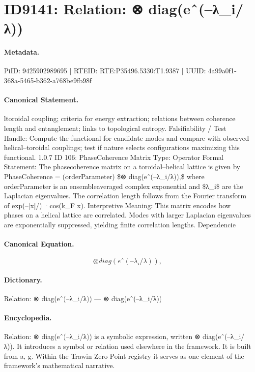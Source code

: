 \section*{ID9141: Relation: ⊗ diag(eˆ(–λ\_i/λ))}
\paragraph{Metadata.}
PiID: 9425902989695 | RTEID: RTE:P35496.5330:T1.9387 | UUID: 4a99a0f1-368a-5465-b362-a768be9fb98f

\paragraph{Canonical Statement.}
ltoroidal coupling; criteria for energy extraction; relations between coherence length and entanglement; links to topological entropy. Falsifiability / Test Handle: Compute the functional for candidate modes and compare with observed helical–toroidal couplings; test if nature selects configurations maximizing this functional. 1.0.7 ID 106: PhaseCoherence Matrix Type: Operator Formal Statement: The phasecoherence matrix on a toroidal–helical lattice is given by PhaseCoherence = (orderParameter) \$⊗ diag(eˆ(–λ\_i/λ)),\$ where orderParameter is an ensembleaveraged complex exponential and \$λ\_i\$ are the Laplacian eigenvalues. The correlation length follows from the Fourier transform of exp(–|x|/) ·cos(k\_F x). Interpretive Meaning: This matrix encodes how phases on a helical lattice are correlated. Modes with larger Laplacian eigenvalues are exponentially suppressed, yielding finite correlation lengths. Dependencie

\paragraph{Canonical Equation.}
\[
⊗ diag(eˆ(–λ_i/λ)),
\]

\paragraph{Dictionary.}
Relation: ⊗ diag(eˆ(–λ\_i/λ)) — ⊗ diag(eˆ(–λ\_i/λ))

\paragraph{Encyclopedia.}
Relation: ⊗ diag(eˆ(–λ\_i/λ)) is a symbolic expression, written ⊗ diag(eˆ(–λ\_i/λ)). It introduces a symbol or relation used elsewhere in the framework. It is built from a, g. Within the Trawin Zero Point registry it serves as one element of the framework's mathematical narrative.
